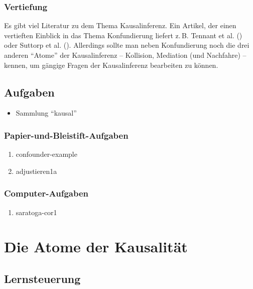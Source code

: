 \documentclass[
  ngerman,
  letterpaper,
  twoside,
  open=any]{scrbook}
\providecommand{\tightlist}{%
  \setlength{\itemsep}{0pt}\setlength{\parskip}{0pt}}\usepackage{longtable,booktabs,array}
\theoremstyle{definition}
\theoremstyle{plain}
\theoremstyle{definition}
\theoremstyle{definition}
\theoremstyle{definition}
\theoremstyle{definition}
\theoremstyle{remark}
\begin{document}
\subsection{Vertiefung}\label{vertiefung-6}

Es gibt viel Literatur zu dem Thema Kausalinferenz. Ein Artikel, der
einen vertieften Einblick in das Thema Konfundierung liefert z.\,B.
Tennant et al. () oder Suttorp et al.
(). Allerdings sollte man neben
Konfundierung noch die drei anderen \enquote{Atome} der Kausalinferenz
-- Kollision, Mediation (und Nachfahre) -- kennen, um gängige Fragen der
Kausalinferenz bearbeiten zu können.

\section{Aufgaben}\label{aufgaben-11}

\begin{itemize}
\tightlist
\item
  Sammlung \enquote{kausal}
\end{itemize}

\subsection{Papier-und-Bleistift-Aufgaben}\label{papier-und-bleistift-aufgaben-5}

\begin{enumerate}
\def\labelenumi{\arabic{enumi}.}
\tightlist
\item
  confounder-example
\item
  adjustieren1a
\end{enumerate}

\subsection{Computer-Aufgaben}\label{computer-aufgaben-1}

\begin{enumerate}
\def\labelenumi{\arabic{enumi}.}
\tightlist
\item
  saratoga-cor1
\end{enumerate}

\chapter{Die Atome der Kausalität}\label{sec-kausal2}

\section{Lernsteuerung}\label{lernsteuerung-12}
\end{document}
